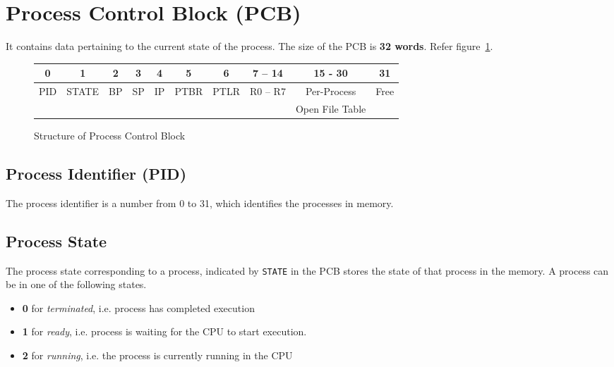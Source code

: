 \documentclass[10pt]{report}
\begin{document}
\section{Process Control Block (PCB)}
\label{sec:pcb}
It contains data pertaining to the current state of the process. The size of the PCB is \textbf{32 words}. Refer figure~\ref{fig:pcb}.\\


	\begin{figure}[htp!]
		\centering
		\begin{tabular}{|c|c|c|c|c|c|c|c|c|c|}
			\hline
			0 & 1 & 2 & 3 & 4 & 5 & 6 & 7 -- 14 & 15 - 30 &  31 \\
			\hline
			PID & STATE & BP & SP & IP & PTBR & PTLR & R0 -- R7 & Per-Process & Free\\ & & & & & & & & Open File Table &   \\
			\hline
		\end{tabular}
		\caption{Structure of Process Control Block}
		\label{fig:pcb}
	\end{figure}

 \subsection{Process Identifier (PID)}
 \label{sec:pid}
 The process identifier is a number from 0 to 31, which identifies the processes in memory. 
 
	 \subsection{Process State} 
	 \label{sec:processstate}
	 The process state corresponding to a process, indicated by \texttt{STATE} in the PCB stores the state of that process in the memory. A process can be in one of the following states. 
	\begin{itemize}
		\item \textbf{0} for \textit{terminated}, i.e. process has completed execution
		\item \textbf{1} for \textit{ready}, i.e. process is waiting for the CPU to start execution.
		\item \textbf{2} for \textit{running}, i.e. the process is currently running in the CPU
	\end{itemize}
	
\end{document}
